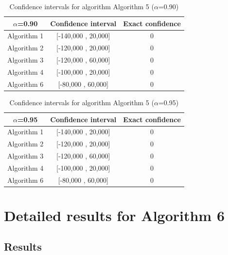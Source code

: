 \documentclass[a4paper,10pt]{article}
\begin{document}
\begin{table}[!htp]
\centering\small
\begin{tabular}{
|c|c|c|}
\hline
 $\alpha$=0.90 & Confidence interval & Exact confidence \\ \hline 
Algorithm 1 & [-140,000 , 20,000] & 0\\ \hline 
Algorithm 2 & [-120,000 , 20,000] & 0\\ \hline 
Algorithm 3 & [-120,000 , 60,000] & 0\\ \hline 
Algorithm 4 & [-100,000 , 20,000] & 0\\ \hline 
Algorithm 6 & [-80,000 , 60,000] & 0\\ \hline 

\end{tabular}
\caption{Confidence intervals for algorithm Algorithm 5 ($\alpha$=0.90)}
\end{table}
\begin{table}[!htp]
\centering\small
\begin{tabular}{
|c|c|c|}
\hline
 $\alpha$=0.95 & Confidence interval & Exact confidence \\ \hline 
Algorithm 1 & [-140,000 , 20,000] & 0\\ \hline 
Algorithm 2 & [-120,000 , 20,000] & 0\\ \hline 
Algorithm 3 & [-120,000 , 60,000] & 0\\ \hline 
Algorithm 4 & [-100,000 , 20,000] & 0\\ \hline 
Algorithm 6 & [-80,000 , 60,000] & 0\\ \hline 

\end{tabular}
\caption{Confidence intervals for algorithm Algorithm 5 ($\alpha$=0.95)}
\end{table}

 \clearpage 


\section{Detailed results for Algorithm 6}


\subsection{Results}
\end{document}
